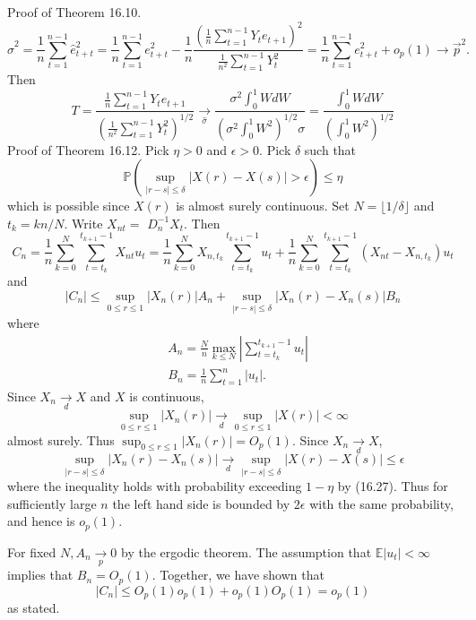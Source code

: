 \documentclass[10pt]{article}
\begin{document}
Proof of Theorem 16.10.
$$
\widehat{\sigma}^{2}=\frac{1}{n} \sum_{t=1}^{n-1} \widehat{e}_{t+t}^{2}=\frac{1}{n} \sum_{t=1}^{n-1} e_{t+t}^{2}-\frac{1}{n} \frac{\left(\frac{1}{n} \sum_{t=1}^{n-1} Y_{t} e_{t+1}\right)^{2}}{\frac{1}{n^{2}} \sum_{t=1}^{n-1} Y_{t}^{2}}=\frac{1}{n} \sum_{t=1}^{n-1} e_{t+t}^{2}+o_{p}(1) \longrightarrow \vec{p}^{2} .
$$
Then
$$
T=\frac{\frac{1}{n} \sum_{t=1}^{n-1} Y_{t} e_{t+1}}{\left(\frac{1}{n^{2}} \sum_{t=1}^{n-1} Y_{t}^{2}\right)^{1 / 2}} \underset{\widehat{\sigma}}{\longrightarrow} \frac{\sigma^{2} \int_{0}^{1} W d W}{\left(\sigma^{2} \int_{0}^{1} W^{2}\right)^{1 / 2} \sigma}=\frac{\int_{0}^{1} W d W}{\left(\int_{0}^{1} W^{2}\right)^{1 / 2}}
$$
Proof of Theorem 16.12. Pick $\eta>0$ and $\epsilon>0$. Pick $\delta$ such that
$$
\mathbb{P}\left(\sup _{|r-s| \leq \delta}|X(r)-X(s)|>\epsilon\right) \leq \eta
$$
which is possible since $X(r)$ is almost surely continuous. Set $N=\lfloor 1 / \delta\rfloor$ and $t_{k}=k n / N$. Write $X_{n t}=$ $D_{n}^{-1} X_{t}$. Then
$$
C_{n}=\frac{1}{n} \sum_{k=0}^{N} \sum_{t=t_{k}}^{t_{k+1}-1} X_{n t} u_{t}=\frac{1}{n} \sum_{k=0}^{N} X_{n, t_{k}} \sum_{t=t_{k}}^{t_{k+1}-1} u_{t}+\frac{1}{n} \sum_{k=0}^{N} \sum_{t=t_{k}}^{t_{k+1}-1}\left(X_{n t}-X_{n, t_{k}}\right) u_{t}
$$
and
$$
\left|C_{n}\right| \leq \sup _{0 \leq r \leq 1}\left|X_{n}(r)\right| A_{n}+\sup _{|r-s| \leq \delta}\left|X_{n}(r)-X_{n}(s)\right| B_{n}
$$
where
$$
\begin{aligned}
&A_{n}=\frac{N}{n} \max _{k \leq N}\left|\sum_{t=t_{k}}^{t_{k+1}-1} u_{t}\right| \\
&B_{n}=\frac{1}{n} \sum_{t=1}^{n}\left|u_{t}\right| .
\end{aligned}
$$
Since $X_{n} \underset{d}{\longrightarrow} X$ and $X$ is continuous,
$$
\sup _{0 \leq r \leq 1}\left|X_{n}(r)\right| \underset{d}{\longrightarrow} \sup _{0 \leq r \leq 1}|X(r)|<\infty
$$
almost surely. Thus $\sup _{0 \leq r \leq 1}\left|X_{n}(r)\right|=O_{p}(1)$. Since $X_{n} \underset{d}{\longrightarrow} X$,
$$
\sup _{|r-s| \leq \delta}\left|X_{n}(r)-X_{n}(s)\right| \underset{d}{\longrightarrow} \sup _{|r-s| \leq \delta}|X(r)-X(s)| \leq \epsilon
$$
where the inequality holds with probability exceeding $1-\eta$ by (16.27). Thus for sufficiently large $n$ the left hand side is bounded by $2 \epsilon$ with the same probability, and hence is $o_{p}(1)$.

For fixed $N, A_{n} \underset{p}{\longrightarrow} 0$ by the ergodic theorem. The assumption that $\mathbb{E}\left|u_{t}\right|<\infty$ implies that $B_{n}=O_{p}(1)$. Together, we have shown that
$$
\left|C_{n}\right| \leq O_{p}(1) o_{p}(1)+o_{p}(1) O_{p}(1)=o_{p}(1)
$$
as stated.
\end{document}
